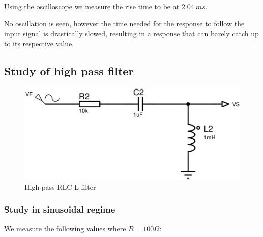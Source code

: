 \documentclass[11pt, openright]{book}
\begin{document}
\vspace{5.5cm}

Using the oscilloscope we measure the rise time to be at $2.04\  ms$. 

No oscillation is seen, however the time needed for the response to follow the input signal is drastically slowed, resulting in a response that can barely catch up to its respective value. 


\subsection{Study of high pass filter}

\begin{figure}[ht]
	\centering
	\includegraphics{./Circuit/Circuit2.jpeg}
	\caption{High pass RLC-L filter}
\end{figure}

\subsubsection{Study in sinusoidal regime}

We measure the following values where $R=100\Omega$:
\end{document}
